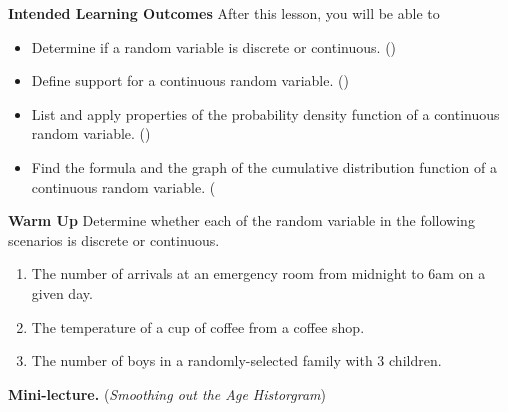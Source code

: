 \documentclass[10pt]{article}
\begin{document}
\thispagestyle{firstpage}
\pagestyle{otherpages}


\textbf{Intended Learning Outcomes}
After this lesson, you will be able to 

\begin{itemize}
    \item Determine if a random variable is discrete or continuous. ()
    \item Define support for a continuous random variable. ()
    \item List and apply properties of the probability density function of a continuous random variable. ()
    \item Find the formula and the graph of the cumulative distribution function of a continuous random variable. (
\end{itemize}

\vspace{-0.5cm}

\hrulefill

\textbf{\color{blue} Warm Up} Determine whether each of the random variable in the following scenarios is discrete or continuous.

\begin{enumerate}[label=(\alph*)]
    \item The number of arrivals at an emergency room from midnight to 6am on a given day.

    \vfill

    \item The temperature of a cup of coffee from a coffee shop.

    \vfill 

    \item The number of boys in a randomly-selected family with 3 children.

    \vfill
\end{enumerate}

\newpage%

{\bf\color{blue}Mini-lecture.} ({\it Smoothing out the Age Historgram})
\end{document}
